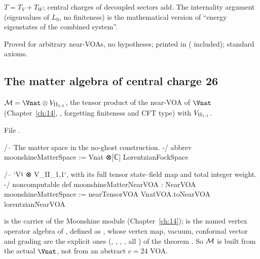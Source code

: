 \begin{physics}
$T=T_V+T_W$; central charges of decoupled sectors add.  The internality argument (eigenvalues of $L_0$, no
finiteness) is the mathematical version of ``energy eigenstates of the combined system''.
\end{physics}

\begin{status}
Proved for arbitrary near-VOAs, no hypotheses; printed in 
( included); standard axioms.
\end{status}

\subsection{The matter algebra of central charge 26}

\begin{definition}\label{ch17:def:matter}
$\chseventeenM=\Vnat\otimes\chseventeenVII$, the tensor product of the near-VOA of $\Vnat$ (Chapter~\ref{ch:14},
, forgetting finiteness and CFT type) with ${V_{\mathrm{II}_{1,1}}}$.
\end{definition}

\noindent File .
\begin{leancode}
/-- The matter space in the no-ghost construction. -/
abbrev moonshineMatterSpace := Vnat ⊗[ℂ] LorentzianFockSpace

/-- `V♮ ⊗ V_{II_{1,1}}`, with its full tensor state–field map and total integer weight. -/
noncomputable def moonshineMatterNearVOA : NearVOA moonshineMatterSpace :=
  nearTensorVOA VnatVOA.toNearVOA lorentzianNearVOA
\end{leancode}

\begin{dictionary}
 is the carrier of the Moonshine module (Chapter~\ref{ch:14});  is the named vertex operator algebra of ,
defined as , whose vertex map, vacuum, conformal vector and grading are the
explicit ones (, , , , all
) of the theorem .  So $\mathcal{M}$ is built from the actual $\Vnat$, not from an
abstract $c=24$ VOA.
\end{dictionary}

